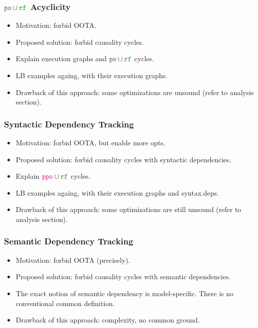 \subsubsection{$\lPO\cup\lRF$ Acyclicity}

\begin{itemize}
  \item Motivation: forbid OOTA.
  \item Proposed solution: forbid causality cycles. 
  \item Explain execution graphs and $\lPO\cup\lRF$ cycles.
  \item LB examples againg, with their execution graphs.
  \item Drawback of this approach: some optimizations are unsound 
    (refer to analysis section).
\end{itemize}

\subsubsection{Syntactic Dependency Tracking}

\begin{itemize}
  \item Motivation: forbid OOTA, but enable more opts.
  \item Proposed solution: forbid causality cycles with syntactic dependencies. 
  \item Explain $\lPPO\cup\lRF$ cycles.
  \item LB examples againg, with their execution graphs and syntax.deps.
  \item Drawback of this approach: some optimizations are still unsound 
    (refer to analysis section).
\end{itemize}

\subsubsection{Semantic Dependency Tracking}

\begin{itemize}
  \item Motivation: forbid OOTA (precisely).
  \item Proposed solution: forbid causality cycles with semantic dependencies. 
  \item The exact notion of semantic dependency is model-specific.
        There is no conventional common definition.
  \item Drawback of this approach: complexity, no common ground.
\end{itemize}

